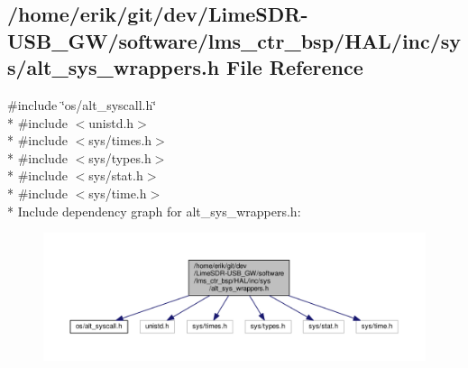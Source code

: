 \subsection{/home/erik/git/dev/\+Lime\+S\+D\+R-\/\+U\+S\+B\+\_\+\+G\+W/software/lms\+\_\+ctr\+\_\+bsp/\+H\+A\+L/inc/sys/alt\+\_\+sys\+\_\+wrappers.h File Reference}
\label{alt__sys__wrappers_8h}
{\ttfamily \#include \char`\"{}os/alt\+\_\+syscall.\+h\char`\"{}}\\*
{\ttfamily \#include $<$unistd.\+h$>$}\\*
{\ttfamily \#include $<$sys/times.\+h$>$}\\*
{\ttfamily \#include $<$sys/types.\+h$>$}\\*
{\ttfamily \#include $<$sys/stat.\+h$>$}\\*
{\ttfamily \#include $<$sys/time.\+h$>$}\\*
Include dependency graph for alt\+\_\+sys\+\_\+wrappers.\+h\+:
\nopagebreak
\begin{figure}[H]
\begin{center}
\leavevmode
\includegraphics[width=350pt]{d6/d60/alt__sys__wrappers_8h__incl}
\end{center}
\end{figure}
